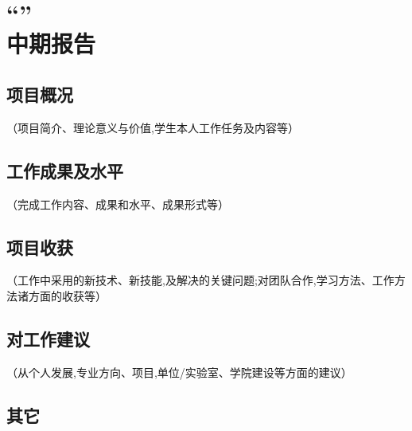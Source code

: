 \chapter*{``\zjutitlec'' \\ 中期报告}

\section{项目概况}

（项目简介、理论意义与价值,学生本人工作任务及内容等）

\section{工作成果及水平}

（完成工作内容、成果和水平、成果形式等）

\section{项目收获}

（工作中采用的新技术、新技能,及解决的关键问题;对团队合作,学习方法、工作方法诸方面的收获等）

\section{对工作建议}

（从个人发展,专业方向、项目,单位/实验室、学院建设等方面的建议）

\section{其它}

